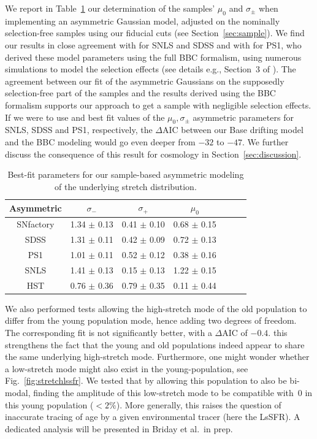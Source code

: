 \documentclass[]{aa}
\newcommand{\nn}[1]{\textcolor[rgb]{0.4, 0.8, 0}{#1}}
\begin{document}
We report in Table~\ref{tab:bbc} \nn{our determination of} the samples' $\mu_0$
and $\sigma_{\pm}$ \nn{when implementing an asymmetric Gaussian model}, adjusted
on the nominally selection-free samples using our fiducial cuts (see
Section~\ref{sec:sample}). We find our results in close agreement with
\cite{scolnic2016} for SNLS and SDSS and with \cite{scolnic2018a} for PS1, who
derived these model parameters using the full BBC formalism, using numerous
simulations to model the selection effects (see details e.g., Section~3 of
\citealt{kessler2017}). The agreement between our fit of the asymmetric
Gaussians on the supposedly selection-free part of the samples and the results
derived using the BBC formalism supports our approach to get a sample with
negligible selection effects. If we were to use \cite{scolnic2016} and
\cite{scolnic2018a} best fit values of the $\mu_0, \sigma_{\pm}$ asymmetric
parameters for SNLS, SDSS and PS1, respectively, the $\Delta$AIC between our
Base drifting model and the BBC modeling would go even deeper from $-32$ to
$-47$. We further discuss the consequence of this result for cosmology in
Section~\ref{sec:discussion}.
    
\begin{table}
    \centering
    \caption{Best-fit parameters for our sample-based asymmetric modeling of the
    underlying stretch distribution.}
    \label{tab:bbc}
    \begin{tabular}{ccccccc}
    \hline\hline
    Asymmetric & $\sigma_{-}$ & $\sigma_{+}$ & $\mu_0$ \\
    \hline
    SNfactory & 1.34 $\pm$ 0.13 & 0.41 $\pm$ 0.10 & 0.68 $\pm$ 0.15 \\
    SDSS & 1.31 $\pm$ 0.11 & 0.42 $\pm$ 0.09 & 0.72 $\pm$ 0.13 \\
    PS1 & 1.01 $\pm$ 0.11 & 0.52 $\pm$ 0.12 & 0.38 $\pm$ 0.16 \\
    SNLS & 1.41 $\pm$ 0.13 & 0.15 $\pm$ 0.13 & 1.22 $\pm$ 0.15 \\
    HST & 0.76 $\pm$ 0.36 & 0.79 $\pm$ 0.35 & 0.11 $\pm$ 0.44 \\
    \hline
    \end{tabular}
\end{table}
    
We also performed tests allowing the high-stretch mode of the old population to
differ from the young population mode, hence adding two degrees of freedom. The
corresponding fit is not significantly better, with a $\Delta$AIC of $-0.4$.
this strengthens the fact that the young and old populations indeed appear to
share the same underlying high-stretch mode. Furthermore, one might wonder
whether a low-stretch mode might also exist in the young-population, see
Fig.~\ref{fig:stretchlssfr}. We tested that by allowing this population to also
be bi-modal, finding the amplitude of this low-stretch mode to be compatible
with~0 in this young population ($<2\%$). More generally, this raises the
question of inaccurate tracing of age by a given environmental tracer (here the
LsSFR). A dedicated analysis will be presented in Briday et al.\ in prep.
\end{document}
